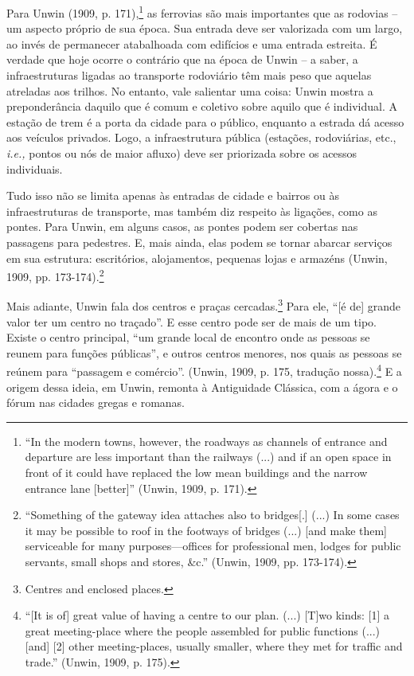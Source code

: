 \documentclass[12pt, a4paper]{book} %
\begin{document}
        Para Unwin (1909, p. 171),\footnote[49]{``In the modern towns, however, the roadways as channels of entrance and departure are less important than the railways (...) and if an open space in front of it could have replaced the low mean buildings and the narrow entrance lane [better]'' (Unwin, 1909, p. 171).} as ferrovias são mais importantes que as rodovias – um aspecto próprio de sua época. Sua entrada deve ser valorizada com um largo, ao invés de permanecer atabalhoada com edifícios e uma entrada estreita. É verdade que hoje ocorre o contrário que na época de Unwin – a saber, a infraestruturas ligadas ao transporte rodoviário têm mais peso que aquelas atreladas aos trilhos. No entanto, vale salientar uma coisa: Unwin mostra a preponderância daquilo que é comum e coletivo sobre aquilo que é individual. A estação de trem é a porta da cidade para o público, enquanto a estrada dá acesso aos veículos privados. Logo, a infraestrutura pública (estações, rodoviárias, etc., \textit{i.e.,} pontos ou nós de maior afluxo) deve ser priorizada sobre os acessos individuais.

        Tudo isso não se limita apenas às entradas de cidade e bairros ou às infraestruturas de transporte, mas também diz respeito às ligações, como as pontes. Para Unwin, em alguns casos, as pontes podem ser cobertas nas passagens para pedestres. E, mais ainda, elas podem se tornar abarcar serviços em sua estrutura: escritórios, alojamentos, pequenas lojas e armazéns (Unwin, 1909, pp. 173-174).\footnote[50]{``Something of the gateway idea attaches also to bridges[.] (...) In some cases it may be possible to roof in the footways of bridges (...) [and make them] serviceable for many purposes—offices for professional men, lodges for public servants, small shops and stores, \&c.'' (Unwin, 1909, pp. 173-174).}

        Mais adiante, Unwin fala dos centros e praças cercadas.\footnote[51]{Centres and enclosed places.} Para ele, ``[é de] grande valor ter um centro no traçado''. E esse centro pode ser de mais de um tipo. Existe o centro principal, ``um grande local de encontro onde as pessoas se reunem para funções públicas'', e outros centros menores, nos quais as pessoas se reúnem para ``passagem e comércio''. (Unwin, 1909, p. 175, tradução nossa).\footnote[52]{``[It is of] great value of having a centre to our plan. (...) [T]wo kinds: [1] a great meeting-place where the people assembled for public functions (...) [and] [2] other meeting-places, usually smaller, where they met for traffic and trade.'' (Unwin, 1909, p. 175).} E a origem dessa ideia, em Unwin, remonta à Antiguidade Clássica, com a ágora e o fórum nas cidades gregas e romanas.
\end{document}
